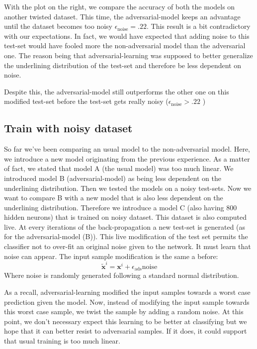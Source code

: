 			With the plot on the right, we compare the accuracy of both the models on another twisted dataset. This time, the adversarial-model keeps an advantage until the dataset becomes too noisy $\epsilon_{\text{noise}}=.22$. This result is a bit contradictory with our expectations. In fact, we would have expected that adding noise to this test-set would have fooled more the non-adversarial model than the adversarial one. The reason being that adversarial-learning was supposed to better generalize the underlining distribution of the test-set and therefore be less dependent on noise.

			Despite this, the adversarial-model still outperforms the other one on this modified test-set before the test-set gets really noisy ($\epsilon_{\text{noise}}>.22$ )



		\subsection{Train with noisy dataset}
		\label{ssub:train_with_noisy_dataset}
			So far we've been comparing an usual model to the non-adversarial model. Here, we introduce a new model originating from the previous experience. As a matter of fact, we stated that model A (the usual model) was too much linear. We introduced model B (adversarial-model) as being less dependent on the underlining distribution. Then we tested the models on a noisy test-sets. Now we want to compare B with a new model that is also less dependent on the underlining distribution. Therefore we introduce a model C (also having 800 hidden neurons) that is trained on noisy dataset. This dataset is also computed live. At every iterations of the back-propagation a new test-set is generated (as for the adversarial-model (B)). This live modification of the test set permits the classifier not to over-fit an original noise given to the network. It must learn that noise can appear. The input sample modification is the same a before: 
			$$ \tilde{\boldsymbol{x}}^i = \boldsymbol{x}^i + \epsilon_{\text{ads}} \text{noise} $$
			Where noise is randomly generated following a standard normal distribution.

			As a recall, adversarial-learning modified the input samples towards a worst case prediction given the model. Now, instead of modifying the input sample towards this worst case sample, we twist the sample by adding a random noise. At this point, we don't necessary expect this learning to be better at classifying but we hope that it can better resist to adversarial samples. If it does, it could support that usual training is too much linear.

